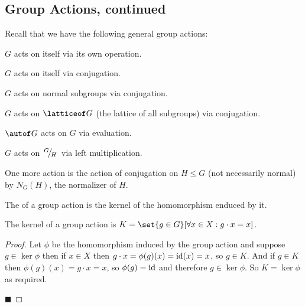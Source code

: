 \documentclass[10pt]{article}
\def\slfrac#1#2{\left.{}^{#1}\mkern-4mu\middle/\mkern-3mu{}_{#2}\right.}
\begin{document}


\bigskip

\subsection{Group Actions, continued}

Recall that we have the following general group actions:
\blist
    \item $G$ acts on itself via its own operation.
    \item $G$ acts on itself via conjugation.
    \item $G$ acts on normal subgroups via conjugation.
    \item $G$ acts on $\latticeof G$ (the lattice of all subgroups) via conjugation.
    \item $\autof G$ acts on $G$ via evaluation.
    \item $G$ acts on $\slfrac GH$ via left multiplication.
\elist

One more action is the action of conjugation on $H\leq G$ (not necessarily normal) by $N_G(H)$, the normalizer of $H$.

\begin{defn*}

    The  of a group action is the kernel of the homomorphism enduced by it.

\end{defn*}

\begin{lemm*}

    The kernel of a group action is $K=\set{g\in G}[\forall x\in X: g\cdot x=x]$.

\end{lemm*}

\begin{proof}

    Let $\phi$ be the homomorphism induced by the group action and suppose $g\in\ker\phi$ then if $x\in X$ then $g\cdot x=\phi(g)(x)={\rm id}(x)=x$, so $g\in K$.
    And if $g\in K$ then $\phi(g)(x)=g\cdot x=x$, so $\phi(g)={\rm id}$ and therefore $g\in\ker\phi$.
    So $K=\ker\phi$ as required.

    \hfill$\blacksquare$

\end{proof}
\end{document}
